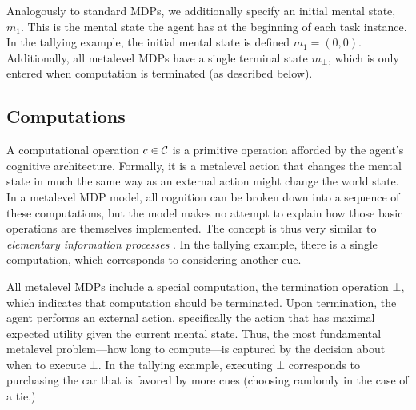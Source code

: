 
Analogously to standard MDPs, we additionally specify an initial mental state, $m_1$. This is the mental state the agent has at the beginning of each task instance. In the tallying example, the initial mental state is defined $m_1 = (0, 0)$. Additionally, all metalevel MDPs have a single terminal state $m_\bot$, which is only entered when computation is terminated (as described below).

\subsection{Computations}
A computational operation $c \in \mathcal{C}$ is a primitive operation afforded by the agent's cognitive architecture. Formally, it is a metalevel action that changes the mental state in much the same way as an external action might change the world state. In a metalevel MDP model, all cognition can be broken down into a sequence of these computations, but the model makes no attempt to explain how those basic operations are themselves implemented. The concept is thus very similar to \emph{elementary information processes} \citep{chase1978elementary,simon1979information,posner1982information,payne1988adaptive}. In the tallying example, there is a single computation, which corresponds to considering another cue.

All metalevel MDPs include a special computation, the termination operation $\bot$, which indicates that computation should be terminated. Upon termination, the agent performs an external action, specifically the action that has maximal expected utility given the current mental state. Thus, the most fundamental metalevel problem---how long to compute---is captured by the decision about when to execute $\bot$. In the tallying example, executing $\bot$ corresponds to purchasing the car that is favored by more cues (choosing randomly in the case of a tie.)


